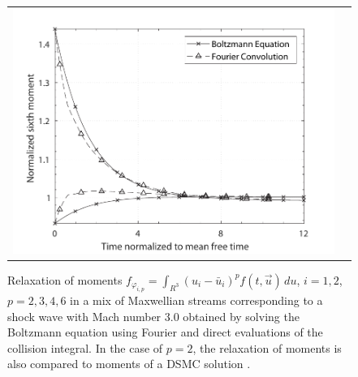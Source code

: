 \documentclass[12pt]{CSUNthesis}
\begin{document}
\begin{center}
\begin{figure}[h]
\begin{tabular}{@{}cc@{}}
  \includegraphics[height=.218\textheight]{images/m300_N33_mom6.pdf}\\
  \end{tabular}
\caption{\label{fig02} Relaxation of moments $f_{\varphi_{i,p}} = 
\int_{R^3} (u_{i}-\bar{u}_{i})^p f(t,\vec{u})\, du$, $i=1,2$, $p=2,3,4,6$ 
in a mix of Maxwellian streams corresponding to a shock wave with 
Mach number 3.0 obtained by solving the Boltzmann equation using Fourier and direct evaluations of the collision integral. In the case of $p=2$, the relaxation of moments 
is also compared to moments of a DSMC solution \cite{Boyd1991411}. }
\end{figure}
\end{center}
\end{document}

